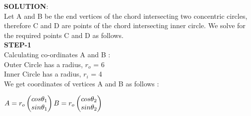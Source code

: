 \documentclass[10pt,a4paper]{report}
\begin{document}
\begin{multicols}{2}
\raggedright \textbf{SOLUTION}:\vspace{2mm}\\
Let A and B be the end vertices of the chord intersecting two concentric circles, therefore C and D are points of the chord intersecting inner circle. We solve for the required points C and D as follows.\vspace{4mm}\\
\textbf{STEP-1}\vspace{2mm}\\
Calculating co-ordinates A and B : \vspace{2mm}\\ 
Outer Circle has a radius, $r_o$ = 6\vspace{2mm}\\ 
Inner Circle has a radius, $r_i$ = 4\vspace{2mm}\\
We get coordinates of vertices A and B as follows :\vspace{2mm}\\
\begin{center}$
A = r_o \begin{pmatrix}
cos\theta_1\\
sin\theta_1 
\end{pmatrix} 
\vspace{1mm}
B = r_o \begin{pmatrix}
cos\theta_2\\
sin\theta_2 
\end{pmatrix}
$
\end{center}


\end{multicols}
\end{document}
